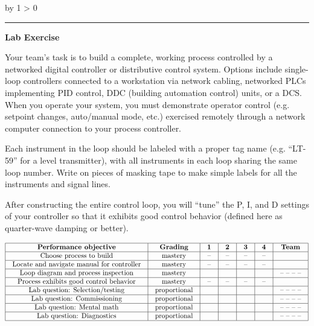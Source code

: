 \documentclass[12pt,a4paper]{article}
\def\oppgave{
            \advance\questnum by 1
            \ifnum \questnum > 0
                 \hrule
                 \vskip 3pt
                 \leftline{Oppgave \the\questnum}
                 \vskip 3pt \fi}
\begin{document}

\vfil \eject 



\oppgave{} 

\noindent
{\bf Lab Exercise}

\vskip 5pt

Your team's task is to build a complete, working process controlled by a networked digital controller or distributive control system.  Options include single-loop controllers connected to a workstation via network cabling, networked PLCs implementing PID control, DDC (building automation control) units, or a DCS.  When you operate your system, you must demonstrate operator control (e.g. setpoint changes, auto/manual mode, etc.) exercised remotely through a network computer connection to your process controller.

Each instrument in the loop should be labeled with a proper tag name (e.g. ``LT-59'' for a level transmitter), with all instruments in each loop sharing the same loop number.  Write on pieces of masking tape to make simple labels for all the instruments and signal lines.

After constructing the entire control loop, you will ``tune'' the P, I, and D settings of your controller so that it exhibits good control behavior (defined here as quarter-wave damping or better).

\vskip 10pt



$$\vbox{\offinterlineskip
\halign{\strut
\vrule \quad\hfil # \ \hfil & 
\vrule \quad\hfil # \ \hfil & 
\vrule \quad\hfil # \ \hfil & 
\vrule \quad\hfil # \ \hfil & 
\vrule \quad\hfil # \ \hfil & 
\vrule \quad\hfil # \ \hfil & 
\vrule \quad\hfil # \ \hfil \vrule \cr
\noalign{\hrule}
%
{\bf Performance objective} & {\bf Grading} & {\bf 1} & {\bf 2} & {\bf 3} & {\bf 4} & {\bf Team} \cr
%
\noalign{\hrule}
%
Choose process to build & mastery & -- & -- & -- & -- & \cr
%
\noalign{\hrule}
%
Locate and navigate manual for controller & mastery & -- & -- & -- & -- & \cr
%
\noalign{\hrule}
%
Loop diagram and process inspection & mastery & & & & & -- -- -- -- \cr
%
\noalign{\hrule}
%
Process exhibits good control behavior & mastery & -- & -- & -- & -- &  \cr
%
\noalign{\hrule}
%
Lab question: Selection/testing & proportional &  &  &  &  & -- -- -- -- \cr
%
\noalign{\hrule}
%
Lab question: Commissioning & proportional &  &  &  &  & -- -- -- -- \cr
%
\noalign{\hrule}
%
Lab question: Mental math & proportional &  &  &  &  & -- -- -- -- \cr
%
\noalign{\hrule}
%
Lab question: Diagnostics & proportional &  &  &  &  & -- -- -- -- \cr
%
\noalign{\hrule}
} %
}$$ %
\end{document}
